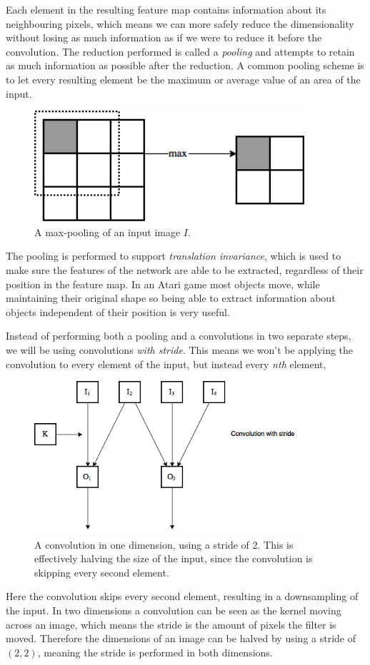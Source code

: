 \documentclass[11pt]{article}
\begin{document}
Each element in the resulting feature map contains information about
its neighbouring pixels, which means we can more safely reduce the dimensionality
without losing as much information as if we were to reduce it before the convolution.
The reduction performed is called a \textit{pooling} and attempts to retain
as much information as possible after the reduction.
A common pooling scheme is to let every resulting element be the maximum
or average value of an area of the input.
\begin{figure}[H]
    \centering
    \includegraphics[width=10cm]{include/pooling.png}
    \caption{A max-pooling of an input image $I$.}
    \label{fig:conv}
\end{figure}
The pooling is performed to support \textit{translation invariance},
which is used to make sure the features of the network are able to
be extracted, regardless of their position in the feature map.
In an Atari game most objects move, while maintaining their original shape so being able to
extract information about objects independent of their position is very useful.

Instead of performing both a pooling and a convolutions in two separate steps,
we will be using convolutions \textit{with stride}.
This means we won't be applying the convolution to 
every element of the input, but instead every \textit{nth} element,
\begin{figure}[!h]\label{con2}
    \centering
    \includegraphics[width=10cm]{include/strides.png}
    \caption{A convolution in one dimension, using a stride of 2.
             This is effectively halving the size of the input, since
             the convolution is skipping every second element.}
    \label{fig:conv}
\end{figure}
\newpage
Here the convolution skips every second element, resulting in a downsampling
of the input.
In two dimensions a convolution can be seen as the kernel moving across
an image, which means the stride is the amount of pixels the filter is moved.
Therefore the dimensions of an image can be halved by using a stride of $(2, 2)$, meaning
the stride is performed in both dimensions.
\end{document}
